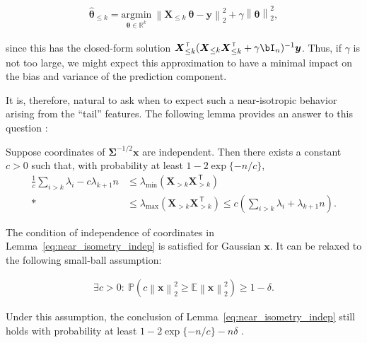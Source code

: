 \begin{align}
	\widehat{{\boldsymbol \theta}}_{\leq k} = \underset{{\boldsymbol \theta} \in{\mathbb R}^k}{\mathrm{argmin}} \  \left\|{\boldsymbol X}_{\leq k} ~ {\boldsymbol \theta} - {\boldsymbol y}\right\|^2_2 + \gamma\left\|{\boldsymbol \theta}\right\|^2_2,
\end{align}

since this has the closed-form solution ${\boldsymbol X}_{\leq k}^\ensuremath{{\scriptscriptstyle\mathsf{\,T}}} ({\boldsymbol X}_{\leq
k}{\boldsymbol X}_{\leq k}^\ensuremath{{\scriptscriptstyle\mathsf{\,T}}} + \gamma\bI_n)^{-1} {\boldsymbol y}$. Thus, if $\gamma$ is not too large, we might expect this  approximation to have a minimal impact on the bias and variance of the prediction component.

It is, therefore, natural to ask when to expect such a near-isotropic behavior arising from the ``tail'' features. The following lemma provides an answer to this question \cite{bartlett2020benign}:

\begin{lemma} 
	\label{eq:near_isometry_indep}
	Suppose coordinates of ${\boldsymbol \Sigma}^{-1/2}{\boldsymbol x}$ are independent. Then there exists a constant $c>0$ such that, with probability at least $1-2\exp\{-n/c\}$,
\begin{align*}
  \frac{1}{c} \sum_{i > k} \lambda_i - c\lambda_{k+1} n & \leq \lambda_{\text{min}}({\boldsymbol X}_{> k}{\boldsymbol X}_{> k}^\ensuremath{{\scriptscriptstyle\mathsf{\,T}}}) \\*
  &\leq \lambda_{\text{max}}({\boldsymbol X}_{> k}{\boldsymbol X}_{> k}^\ensuremath{{\scriptscriptstyle\mathsf{\,T}}}) 
  \leq c\left( \sum_{i > k} \lambda_i + \lambda_{k+1} n\right).
\end{align*}
\end{lemma}

The condition of independence of coordinates in
Lemma~\ref{eq:near_isometry_indep} is satisfied for Gaussian
${\boldsymbol x}$. It can be relaxed to the following small-ball assumption:

\begin{align}
	\label{eq:small_ball}
	\exists c>0:~ \mathbb{P}(c\left\|{\boldsymbol x}\right\|_2^2\geq \mathbb{E}\left\|{\boldsymbol x}\right\|_2^2)\geq 1-\delta.
\end{align}

Under this assumption, the conclusion of Lemma~\ref{eq:near_isometry_indep} still holds with probability at least $1-2\exp\{-n/c\}-n\delta$ \cite{tsigler2020benign}.

